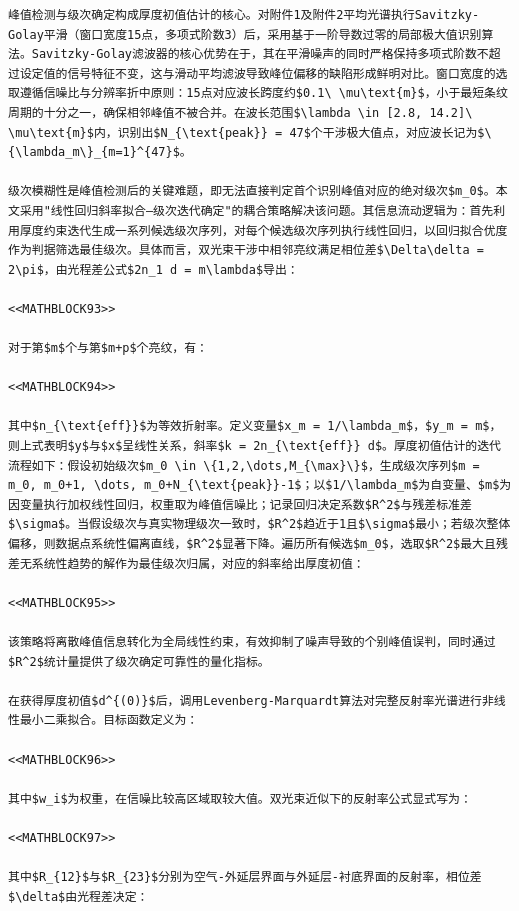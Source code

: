 \documentclass{mcmthesis}
\begin{document}
\begin{table}[htbp]
\begin{lstlisting}
峰值检测与级次确定构成厚度初值估计的核心。对附件1及附件2平均光谱执行Savitzky-Golay平滑（窗口宽度15点，多项式阶数3）后，采用基于一阶导数过零的局部极大值识别算法。Savitzky-Golay滤波器的核心优势在于，其在平滑噪声的同时严格保持多项式阶数不超过设定值的信号特征不变，这与滑动平均滤波导致峰位偏移的缺陷形成鲜明对比。窗口宽度的选取遵循信噪比与分辨率折中原则：15点对应波长跨度约$0.1\ \mu\text{m}$，小于最短条纹周期的十分之一，确保相邻峰值不被合并。在波长范围$\lambda \in [2.8, 14.2]\ \mu\text{m}$内，识别出$N_{\text{peak}} = 47$个干涉极大值点，对应波长记为$\{\lambda_m\}_{m=1}^{47}$。

级次模糊性是峰值检测后的关键难题，即无法直接判定首个识别峰值对应的绝对级次$m_0$。本文采用"线性回归斜率拟合—级次迭代确定"的耦合策略解决该问题。其信息流动逻辑为：首先利用厚度约束迭代生成一系列候选级次序列，对每个候选级次序列执行线性回归，以回归拟合优度作为判据筛选最佳级次。具体而言，双光束干涉中相邻亮纹满足相位差$\Delta\delta = 2\pi$，由光程差公式$2n_1 d = m\lambda$导出：

<<MATHBLOCK93>>

对于第$m$个与第$m+p$个亮纹，有：

<<MATHBLOCK94>>

其中$n_{\text{eff}}$为等效折射率。定义变量$x_m = 1/\lambda_m$，$y_m = m$，则上式表明$y$与$x$呈线性关系，斜率$k = 2n_{\text{eff}} d$。厚度初值估计的迭代流程如下：假设初始级次$m_0 \in \{1,2,\dots,M_{\max}\}$，生成级次序列$m = m_0, m_0+1, \dots, m_0+N_{\text{peak}}-1$；以$1/\lambda_m$为自变量、$m$为因变量执行加权线性回归，权重取为峰值信噪比；记录回归决定系数$R^2$与残差标准差$\sigma$。当假设级次与真实物理级次一致时，$R^2$趋近于1且$\sigma$最小；若级次整体偏移，则数据点系统性偏离直线，$R^2$显著下降。遍历所有候选$m_0$，选取$R^2$最大且残差无系统性趋势的解作为最佳级次归属，对应的斜率给出厚度初值：

<<MATHBLOCK95>>

该策略将离散峰值信息转化为全局线性约束，有效抑制了噪声导致的个别峰值误判，同时通过$R^2$统计量提供了级次确定可靠性的量化指标。

在获得厚度初值$d^{(0)}$后，调用Levenberg-Marquardt算法对完整反射率光谱进行非线性最小二乘拟合。目标函数定义为：

<<MATHBLOCK96>>

其中$w_i$为权重，在信噪比较高区域取较大值。双光束近似下的反射率公式显式写为：

<<MATHBLOCK97>>

其中$R_{12}$与$R_{23}$分别为空气-外延层界面与外延层-衬底界面的反射率，相位差$\delta$由光程差决定：


\end{lstlisting}
\end{table}
\end{document}
